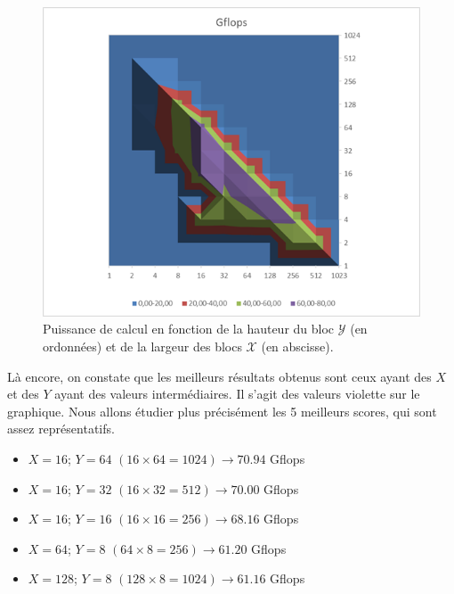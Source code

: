 \documentclass[	DIV=calc,%
							paper=a4,%
							fontsize=11pt%
							]{scrartcl}	 					%
\begin{document}
\begin{figure} 
      \includegraphics[keepaspectratio,width=12cm]{img/Gflops_depending_bloc_size.png}
	  \caption{Puissance de calcul en fonction de la hauteur du bloc $\mathcal{Y}$ (en ordonnées) et de la largeur des blocs $\mathcal{X}$ (en abscisse).}
      \label{fig:2DK2_power}
\end{figure} 
Là encore, on constate que les meilleurs résultats obtenus sont ceux ayant des $ X $ et des $ Y $ ayant des valeurs intermédiaires. Il s'agit des valeurs violette sur le graphique. Nous allons étudier plus précisément les 5 meilleurs scores, qui sont assez représentatifs.\newpage
\begin{itemize}
\item $X = 16$; $Y = 64$ $( 16 \times 64 = 1024 ) \rightarrow 70.94$ Gflops 
\item $X = 16$; $Y = 32$ $( 16 \times 32 = 512 ) \rightarrow 70.00$ Gflops 
\item $X = 16$; $Y = 16$ $( 16 \times 16 = 256 ) \rightarrow 68.16$ Gflops 
\item $X = 64$; $Y = 8$ $( 64 \times 8 = 256 ) \rightarrow 61.20$ Gflops 
\item $X = 128$; $Y = 8$ $( 128 \times 8 = 1024 ) \rightarrow 61.16$ Gflops 
\end{itemize}
\end{document}
